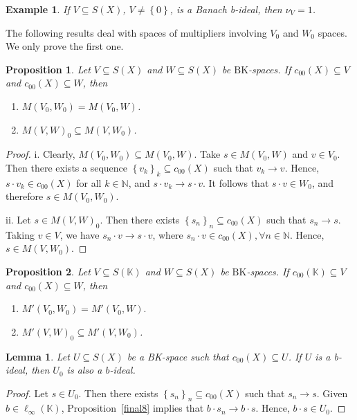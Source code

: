 \documentclass[14pt, a4paper]{article}  %
\providecommand{\llave}[1]{\left\lbrace #1\right\rbrace }
\providecommand{\pare}[1]{\left( #1\right) }
\newcommand{\K}{\mathbb{K}}
\newcommand{\N}{\mathbb{N}}
\newcommand{\BK}{\text{BK}}
\newtheorem{proposition}{Proposition}[section]
\newtheorem{lemma}{Lemma}[section]
\newtheorem{example}{Example}[section]  %
\begin{document}
		\begin{example}\label{again}
		If $V \subseteq S(X)$, $V\neq \llave{0}$, is a Banach b-ideal, then $\nu_{V}=1$.
	\end{example} 
	
The following results deal with spaces of multipliers involving $V_0$ and $W_0$ spaces. We only prove the first one.
		\begin{proposition}\label{chuy18_0_1_0}
		Let  $V \subseteq S\pare{X}$ and $W \subseteq S\pare{X}$ be $\BK$-spaces. 
		If $c_{00}\pare{X} \subseteq V$ and $c_{00}\pare{X} \subseteq W$, then 
		\begin{enumerate}
			\item[i.] $M\pare{V_{0},W_{0}} = M\pare{V_{0},W}$. 
			\item[ii.] $M\pare{V,W}_{0} \subseteq  M\pare{V,W_{0}}$. 
		\end{enumerate} 
	\end{proposition} 
	\begin{proof}
		i. Clearly, $M\pare{V_{0},W_{0}} \subseteq M\pare{V_{0},W}$. 
		Take $s \in M\pare{V_{0},W}$ and $v \in V_{0}$. 
		Then there exists a sequence $\llave{v_{k}}_{k} \subseteq c_{00}\pare{X}$ such that $v_{k} \to v$. 
		Hence, $s \cdot v_{k} \in c_{00}\pare{X}$ for all $k \in \N$, and $s \cdot v_{k} \to s \cdot v$. 
		It follows that $s \cdot v \in W_{0}$, and therefore $s \in M\pare{V_{0},W_{0}}$.
		
		ii. Let $s\in M\pare{V,W}_{0}$. Then there exists $\llave{s_{n}}_{n}\subseteq c_{00}\pare{X}$ such that $s_{n}\to s$. Taking $v\in V$, we have $s_{n}\cdot v\to s\cdot v$, where $s_{n}\cdot v\in c_{00}\pare{X}, \forall n\in \N$. Hence, $s\in M\pare{V,W_{0}}$.
	\end{proof} 
		\begin{proposition}\label{chuy18_0_1_t_0}
		Let $V \subseteq S\pare{\K}$ and $W \subseteq S\pare{X}$ be $\BK$-spaces. 
		If $c_{00}\pare{\K} \subseteq V$ and $c_{00}\pare{X} \subseteq W$, then 
		\begin{enumerate}
			\item[i.] $	M'\pare{V_{0},W_{0}} = M'\pare{V_{0},W}.$
			\item[ii.]  $M'\pare{V,W}_{0} \subseteq  M'\pare{V,W_{0}}$. 
		\end{enumerate} 
	\end{proposition}
	
	\begin{lemma}
		Let  $U \subseteq S\pare{X}$ be a BK-space such that $c_{00} (X) \subseteq U$. If $U$ is a b-ideal, then
		$U_0$ is also a $b$-ideal.
	\end{lemma}
	\begin{proof}
Let $s\in U_{0}$. Then there exists $\llave{s_{n}}_{n}\subseteq c_{00}\pare{X}$ such that $s_{n}\to s$. Given $b\in \ell_{\infty}\pare{\K}$, Proposition~\ref{final8} implies that $b\cdot s_{n}\to b\cdot s$. Hence, $b\cdot s \in U_{0}$.
	\end{proof}
	
\end{document}
